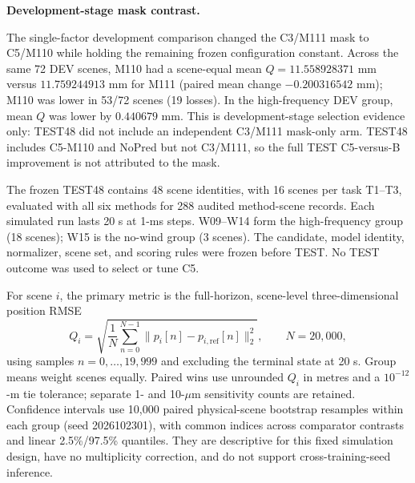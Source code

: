 \documentclass[11pt]{article}
\begin{document}
\noindent\textbf{Development-stage mask contrast.}\par The single-factor development comparison changed the C3/M111 mask to C5/M110 while holding the remaining frozen configuration constant. Across the same 72 DEV scenes, M110 had a scene-equal mean $Q=11.558928371$ mm versus $11.759244913$ mm for M111 (paired mean change $-0.200316542$ mm); M110 was lower in 53/72 scenes (19 losses). In the high-frequency DEV group, mean $Q$ was lower by $0.440679$ mm. This is development-stage selection evidence only: TEST48 did not include an independent C3/M111 mask-only arm. TEST48 includes C5-M110 and NoPred but not C3/M111, so the full TEST C5-versus-B improvement is not attributed to the mask.

The frozen TEST48 contains 48 scene identities, with 16 scenes per task T1--T3, evaluated with all six methods for 288 audited method-scene records. Each simulated run lasts 20 s at 1-ms steps. W09--W14 form the high-frequency group (18 scenes); W15 is the no-wind group (3 scenes). The candidate, model identity, normalizer, scene set, and scoring rules were frozen before TEST. No TEST outcome was used to select or tune C5.

For scene $i$, the primary metric is the full-horizon, scene-level three-dimensional position RMSE
\begin{equation}
  Q_i=\sqrt{\frac{1}{N}\sum_{n=0}^{N-1}
      \|p_i[n]-p_{i,\mathrm{ref}}[n]\|_2^2},
  \qquad N=20{,}000,
  \label{eq:q}
\end{equation}
using samples $n=0,\ldots,19{,}999$ and excluding the terminal state at 20 s. Group means weight scenes equally. Paired wins use unrounded $Q_i$ in metres and a $10^{-12}$-m tie tolerance; separate 1- and 10-$\mu$m sensitivity counts are retained. Confidence intervals use 10,000 paired physical-scene bootstrap resamples within each group (seed 2026102301), with common indices across comparator contrasts and linear 2.5\%/97.5\% quantiles. They are descriptive for this fixed simulation design, have no multiplicity correction, and do not support cross-training-seed inference.
\end{document}
